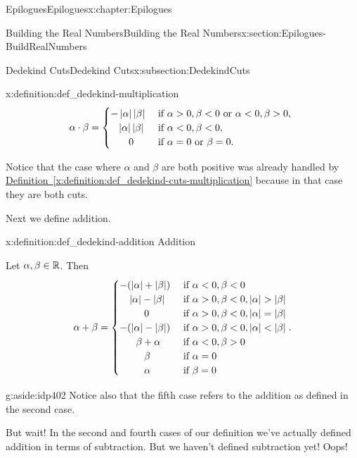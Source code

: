 \begin{chapterptx}{Epilogues}{}{Epilogues}{}{}{x:chapter:Epilogues}
\begin{sectionptx}{Building the Real Numbers}{}{Building the Real Numbers}{}{}{x:section:Epilogues-BuildRealNumbers}
\begin{subsectionptx}{Dedekind Cuts}{}{Dedekind Cuts}{}{}{x:subsection:DedekindCuts}
\begin{definition}{}{x:definition:def_dedekind-multiplication}
\begin{equation*}
					\alpha\cdot\beta = \begin{cases}-\abs{\alpha}\abs{\beta}\amp  \text{ if \(\alpha>0,\beta\lt 0\) or \(\alpha\lt 0, \beta>0,\) }  \\ \ \ \,\abs{\alpha}\abs{\beta}\amp  \text{ if \(\alpha\lt 0,\beta\lt 0,\) }  \\ \ \ \ \ \ \, 0\amp  \text{ if \(\alpha=0\) or \(\beta=0.\) }  {} \end{cases}
				\end{equation*}
			\end{definition}
			Notice that the case where \(\alpha\) and \(\beta\) are both positive was already handled by \hyperref[x:definition:def_dedekind-cuts-multiplication]{Definition~{\xreffont\ref{x:definition:def_dedekind-cuts-multiplication}}} because in that case they are both cuts.%
			\par
			Next we define addition.%
			\begin{definition}{}{x:definition:def_dedekind-addition}%
				\alert{Addition}%
				\par
				 Let \(\alpha, \beta\in\mathbb {R}\). Then%
				\begin{equation*}
					\alpha+\beta= \begin{cases}-(\abs{\alpha}+\abs{\beta}) \amp  \text{ if \(\alpha\lt 0, \beta\lt 0 \) } \\ \ \ \ \abs{\alpha}-\abs{\beta}\amp  \text{ if \(\alpha>0, \beta\lt 0, \abs{\alpha}>\abs{\beta} \)} \\ \ \ \ \ \ \ \ \,0             \amp  \text{ if \(\alpha>0, \beta\lt 0, \abs{\alpha}=\abs{\beta} \)} \\ -(\abs{\alpha}-\abs{\beta})   \amp  \text{ if \(\alpha>0, \beta\lt 0, \abs{\alpha}\lt \abs{\beta} \)} \\ \ \ \ \ \ \beta+\alpha        \amp  \text{ if \(\alpha\lt 0, \beta>0 \) } \\ \ \ \ \ \ \ \ \,\beta{}       \amp  \text{ if \(\alpha=0 \) } \\ \ \ \ \ \ \ \ \,\alpha        \amp  \text{ if \(\beta=0 \) } \end{cases} \text{.}
				\end{equation*}
			\end{definition}
			\begin{aside}{}{g:aside:idp402}%
				Notice also that the fifth case refers to the addition as defined in the second case.%
			\end{aside}
			But wait!  In the second and fourth cases of our definition we've actually defined addition in terms of subtraction. But we haven't defined subtraction yet!  Oops!%

\end{subsectionptx}
\end{sectionptx}
\end{chapterptx}
